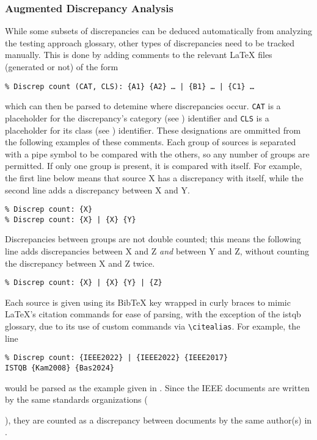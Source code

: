 \subsubsection{Augmented Discrepancy Analysis}
\label{aug-discrep-analysis}
While some subsets of discrepancies can be deduced automatically from analyzing
the testing approach glossary, other types of discrepancies need to be tracked
manually. This is done by adding
comments to the relevant \LaTeX{} files (generated or not) of the form
\begin{displayquote}
    \texttt{\% Discrep count (CAT, CLS): \{A1\} \{A2\} \dots{} | \{B1\}
        \dots{} | \{C1\} %
        \dots}
\end{displayquote}
which can then be parsed to detemine where discrepancies occur. \texttt{CAT} is
a placeholder for the discrepancy's category (see )
identifier and \texttt{CLS} is a placeholder for its class (see
) identifier. These designations are ommitted
from the following examples of these comments. Each group of
sources is separated with a pipe symbol to be compared with the others, so any
number of groups are permitted. If only one group is present, it is compared
with itself. For example, the first line below means that source X has a
discrepancy with itself, while the second line adds a discrepancy between X and Y.
\begin{displayquote}
    \texttt{\% Discrep count: \{X\}\\\% Discrep count: \{X\} | \{X\} \{Y\}}
\end{displayquote}
Discrepancies between groups are not double counted; this means the following
line adds discrepancies between X and Z \emph{and} between Y and Z, without
counting the discrepancy between X and Z twice.
\begin{displayquote}
    \texttt{\% Discrep count: \{X\} | \{X\} \{Y\} | \{Z\}}
\end{displayquote}
Each source is given using its BibTeX key wrapped in curly braces to mimic
\LaTeX{}'s citation commands for ease of parsing, with the exception of the
\acs{istqb} glossary, due to its use of custom commands via
\texttt{\textbackslash citealias}. For example, the line
\begin{displayquote}
    \texttt{\% Discrep count: \{IEEE2022\} | \{IEEE2022\} \{IEEE2017\}\\
        \displayNL ISTQB \{Kam2008\} \{Bas2024\}}
\end{displayquote}
would be parsed as the example given in . Since
the IEEE documents are written by the same standards organizations
(\begin{NoHyper}\citeauthor{IEEE2022}\end{NoHyper}), they are counted as a
discrepancy between documents by the same author(s) in .

